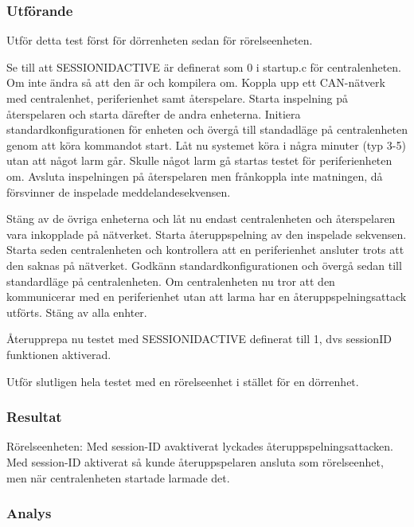 \subsubsection*{Utförande}
Utför detta test först för dörrenheten sedan för rörelseenheten.


Se till att SESSIONIDACTIVE är definerat som 0 i startup.c för centralenheten.
Om inte ändra så att den är och kompilera om.
Koppla upp ett CAN-nätverk med centralenhet, periferienhet samt återspelare.
Starta inspelning på återspelaren och starta därefter de andra enheterna.
Initiera standardkonfigurationen för enheten och övergå till standadläge på centralenheten genom att köra kommandot start.
Låt nu systemet köra i några minuter (typ 3-5) utan att något larm går.
Skulle något larm gå startas testet för periferienheten om.
Avsluta inspelningen på återspelaren men frånkoppla inte matningen, då försvinner de inspelade meddelandesekvensen.


Stäng av de övriga enheterna och låt nu endast centralenheten och återspelaren vara inkopplade på nätverket.
Starta återuppspelning av den inspelade sekvensen.
Starta seden centralenheten och kontrollera att en periferienhet ansluter trots att den saknas på nätverket.
Godkänn standardkonfigurationen och övergå sedan till standardläge på centralenheten.
Om centralenheten nu tror att den kommunicerar med en periferienhet utan att larma har en återuppspelningsattack utförts.
Stäng av alla enhter.

Återupprepa nu testet med SESSIONIDACTIVE definerat till 1, dvs sessionID funktionen aktiverad.

Utför slutligen hela testet med en rörelseenhet i stället för en dörrenhet.



\subsubsection*{Resultat}
Rörelseenheten: Med session-ID avaktiverat lyckades återuppspelningsattacken. Med session-ID aktiverat så kunde återuppspelaren ansluta som rörelseenhet, men när centralenheten startade larmade det. 


\subsubsection*{Analys}



